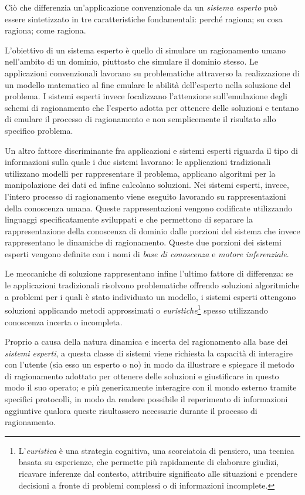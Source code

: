 Ciò che differenzia un'applicazione convenzionale da un \emph{sistema esperto} può essere sintetizzato in tre caratteristiche fondamentali: perché ragiona; su cosa ragiona; come ragiona.

L'obiettivo di un sistema esperto è quello di simulare un ragionamento umano nell'ambito di un dominio, piuttosto che simulare il dominio stesso. Le applicazioni convenzionali lavorano su problematiche attraverso la realizzazione di un modello matematico al fine emulare le abilità dell'esperto nella soluzione del problema. I sistemi esperti invece focalizzano l'attenzione sull'emulazione degli schemi di ragionamento che l'esperto adotta per ottenere delle soluzioni e tentano di emulare il processo di ragionamento e non semplicemente il risultato allo specifico problema.

Un altro fattore discriminante fra applicazioni e sistemi esperti riguarda il tipo di informazioni sulla quale i due sistemi lavorano: le applicazioni tradizionali utilizzano modelli per rappresentare il problema, applicano algoritmi per la manipolazione dei dati ed infine calcolano soluzioni. Nei sistemi esperti, invece, l'intero processo di ragionamento viene eseguito lavorando su rappresentazioni della conoscenza umana. Queste rappresentazioni vengono codificate utilizzando linguaggi specificatamente sviluppati e che permettono di separare la rappresentazione della conoscenza di dominio dalle porzioni del sistema che invece rappresentano le dinamiche di ragionamento. Queste due porzioni dei sistemi esperti vengono definite con i nomi di \emph{base di conoscenza} e \emph{motore inferenziale}.

Le meccaniche di soluzione rappresentano infine l'ultimo fattore di differenza: se le applicazioni tradizionali risolvono problematiche offrendo soluzioni algoritmiche a problemi per i quali è stato individuato un modello, i sistemi esperti ottengono soluzioni applicando metodi approssimati o \emph{euristiche}\footnote{L’\emph{euristica} è una strategia cognitiva, una scorciatoia di pensiero, una tecnica basata su esperienze, che permette più rapidamente di elaborare giudizi, ricavare inferenze dal contesto, attribuire significato alle situazioni e prendere decisioni a fronte di problemi complessi o di informazioni incomplete.} spesso utilizzando conoscenza incerta o incompleta.

Proprio a causa della natura dinamica e incerta del ragionamento alla base dei \emph{sistemi esperti}, a questa classe di sistemi viene richiesta la capacità di interagire con l'utente (sia esso un esperto o no) in modo da illustrare e spiegare il metodo di ragionamento adottato per ottenere delle soluzioni e giustificare in questo modo il suo operato; e più genericamente interagire con il mondo esterno tramite specifici protocolli, in modo da rendere possibile il reperimento di informazioni aggiuntive qualora queste risultassero necessarie durante il processo di ragionamento.

